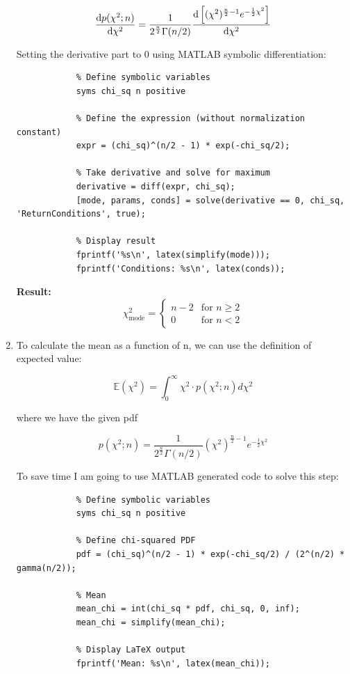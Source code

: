 \documentclass[10pt]{article}
\begin{document}
\begin{enumerate}[label=(\alph*)]
	      \[ \dv{p(\chi^{2};n)}{\chi^{2}} = \frac{1}{2^{\frac{n}{2}}\Gamma(n/2)} \dv{\left[(\chi^{2})^{\frac{n}{2}-1}e^{-\frac{1}{2}\chi^{2}}\right]}{\chi^{2}} \]

	      Setting the derivative part to 0 using MATLAB symbolic differentiation:

	      \begin{verbatim}
			% Define symbolic variables
			syms chi_sq n positive

			% Define the expression (without normalization constant)
			expr = (chi_sq)^(n/2 - 1) * exp(-chi_sq/2);

			% Take derivative and solve for maximum
			derivative = diff(expr, chi_sq);
			[mode, params, conds] = solve(derivative == 0, chi_sq, 'ReturnConditions', true);

			% Display result
			fprintf('%s\n', latex(simplify(mode)));
			fprintf('Conditions: %s\n', latex(conds));
		  \end{verbatim}

	      \textbf{Result:}
	      \[\boxed{
			      \chi^{2}_{\text{mode}} = \begin{cases}
				      n-2 & \text{for } n \geq 2 \\
				      0   & \text{for } n < 2
			      \end{cases} }
	      \]

	\item To calculate the mean as a function of n, we can use the definition of expected value:

	      \[ \mathbb{E}(\chi^2) = \int_0^\infty \chi^2 \cdot p(\chi^2; n) d\chi^2 \]

	      where we have the given pdf

	      \[ p(\chi^{2};n)=\frac{1}{2^{\frac{n}{2}}\Gamma(n/2)}(\chi^{2})^{\frac{n}{2}-1}e^{-\frac{1}{2}\chi^{2}} \]

	      To save time I am going to use MATLAB generated code to solve this step:

	      \begin{verbatim}
			% Define symbolic variables
			syms chi_sq n positive

			% Define chi-squared PDF
			pdf = (chi_sq)^(n/2 - 1) * exp(-chi_sq/2) / (2^(n/2) * gamma(n/2));

			% Mean
			mean_chi = int(chi_sq * pdf, chi_sq, 0, inf);
			mean_chi = simplify(mean_chi);

			% Display LaTeX output
			fprintf('Mean: %s\n', latex(mean_chi));
		  \end{verbatim}


\end{enumerate}
\end{document}
